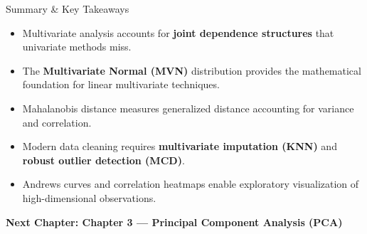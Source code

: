\documentclass[aspectratio=169,ignorenonframetext]{beamer}
\begin{document}
\begin{frame}{Summary \& Key Takeaways}
\begin{itemize}
\item
  Multivariate analysis accounts for \textbf{joint dependence
  structures} that univariate methods miss.
\item
  The \textbf{Multivariate Normal (MVN)} distribution provides the
  mathematical foundation for linear multivariate techniques.
\item
  Mahalanobis distance measures generalized distance accounting for
  variance and correlation.
\item
  Modern data cleaning requires \textbf{multivariate imputation (KNN)}
  and \textbf{robust outlier detection (MCD)}.
\item
  Andrews curves and correlation heatmaps enable exploratory
  visualization of high-dimensional observations.
\end{itemize}

{ \textbf{Next Chapter: Chapter 3 --- Principal Component Analysis
(PCA)} }
\end{frame}
\end{document}
